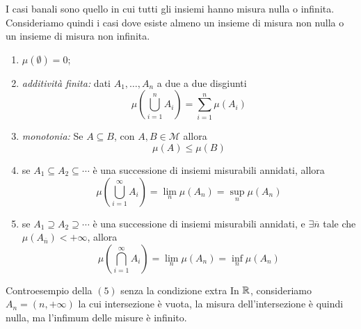 \documentclass[a4paper]{article}
\begin{document}
\begin{radioactive}
I casi banali sono quello in cui tutti gli insiemi hanno misura nulla o infinita.
Consideriamo quindi i casi dove esiste almeno un insieme di misura non nulla
o un insieme di misura non infinita.
\end{radioactive}

\begin{radioactive}
\begin{snippettheorem}{}
    \begin{enumerate}
        \item \(\mu(\emptyset) = 0\);
        \item \emph{additività finita:} dati \(A_1,\ldots,A_n\) a due a due disgiunti \[
                \mu\left(
                    \bigcup_{i=1}^n A_i
                \right)
                = \sum_{i=1}^n \mu(A_i)
            \]
        \item \emph{monotonia:} Se \(A \subseteq B\), con \(A,B\in\mathcal M\) allora
            \[
                \mu(A) \leq \mu(B)
            \]
        \item se \(A_1 \subseteq A_2 \subseteq \cdots\) è una successione di insiemi misurabili annidati, allora
            \[
                \mu\left(
                    \bigcup_{i=1}^\infty A_i
                \right)
                = \lim_{n} \mu(A_n) = \sup_n \mu(A_n)
            \]
        \item se \(A_1 \supseteq A_2 \supseteq \cdots\) è una successione di insiemi misurabili annidati,
            e \(\exists \overline n\) tale che \(\mu(A_{\overline n}) < +\infty\),
            allora
            \[
                \mu\left(
                    \bigcap_{i=1}^\infty A_i
                \right)
                = \lim_{n} \mu(A_n) = \inf_n \mu(A_n)
            \]
    \end{enumerate}
\end{snippettheorem}
\end{radioactive}

\begin{radioactive}
\begin{snippetexample}{Controesempio della \((5)\) senza la condizione extra}
    In \(\mathbb{R}\),
    consideriamo \(A_n = (n ,+\infty)\) la cui intersezione è vuota, la misura
    dell'intersezione è quindi nulla, ma l'infimum delle misure è infinito.
\end{snippetexample}
\end{radioactive}
\end{document}
